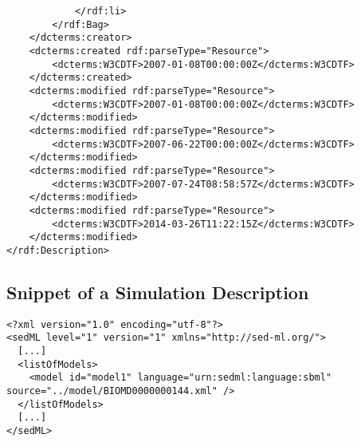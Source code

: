 \begin{mdframed}[style=mddefault,frametitle={Meta Data of the Publication \texttt{Calzone2007.pdf}}]
\begin{verbatim}
			</rdf:li>
		</rdf:Bag>
	</dcterms:creator>
	<dcterms:created rdf:parseType="Resource">
		<dcterms:W3CDTF>2007-01-08T00:00:00Z</dcterms:W3CDTF>
	</dcterms:created>
	<dcterms:modified rdf:parseType="Resource">
		<dcterms:W3CDTF>2007-01-08T00:00:00Z</dcterms:W3CDTF>
	</dcterms:modified>
	<dcterms:modified rdf:parseType="Resource">
		<dcterms:W3CDTF>2007-06-22T00:00:00Z</dcterms:W3CDTF>
	</dcterms:modified>
	<dcterms:modified rdf:parseType="Resource">
		<dcterms:W3CDTF>2007-07-24T08:58:57Z</dcterms:W3CDTF>
	</dcterms:modified>
	<dcterms:modified rdf:parseType="Resource">
		<dcterms:W3CDTF>2014-03-26T11:22:15Z</dcterms:W3CDTF>
	</dcterms:modified>
</rdf:Description>
\end{verbatim}
\end{mdframed}

\subsection{Snippet of a Simulation Description}
\label{sec:simdescr}
\begin{mdframed}[style=mddefault,frametitle={Snippet of \texttt{experiment/Calzone2007-simulation-figure-1B.xml} referring to the model \texttt{/model/BIOMD0000000144.xml}}]
\begin{verbatim}
<?xml version="1.0" encoding="utf-8"?>
<sedML level="1" version="1" xmlns="http://sed-ml.org/">
  [...]
  <listOfModels>
    <model id="model1" language="urn:sedml:language:sbml" source="../model/BIOMD0000000144.xml" />
  </listOfModels>
  [...]
</sedML>
\end{verbatim}
\end{mdframed}